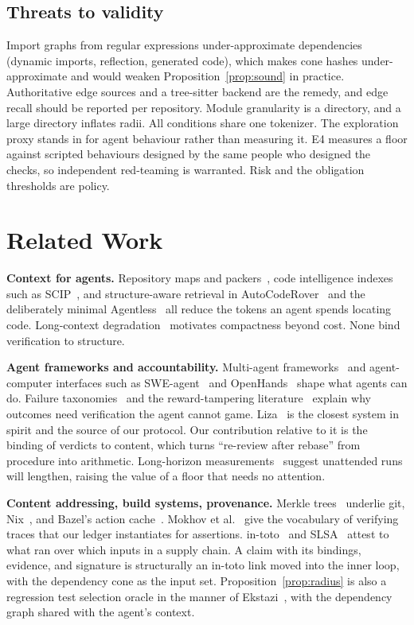 \documentclass[conference]{IEEEtran}
\begin{document}
\subsection{Threats to validity}

Import graphs from regular expressions under-approximate dependencies (dynamic imports, reflection, generated code), which makes cone hashes under-approximate and would weaken Proposition~\ref{prop:sound} in practice. Authoritative edge sources and a tree-sitter backend are the remedy, and edge recall should be reported per repository. Module granularity is a directory, and a large directory inflates radii. All conditions share one tokenizer. The exploration proxy stands in for agent behaviour rather than measuring it. E4 measures a floor against scripted behaviours designed by the same people who designed the checks, so independent red-teaming is warranted. Risk and the obligation thresholds are policy.

\section{Related Work}

\textbf{Context for agents.} Repository maps and packers~\citep{aider,repomix,stacklit}, code intelligence indexes such as SCIP~\citep{scip}, and structure-aware retrieval in AutoCodeRover~\citep{zhang2024autocoderover} and the deliberately minimal Agentless~\citep{xia2024agentless} all reduce the tokens an agent spends locating code. Long-context degradation~\citep{liu2024lost} motivates compactness beyond cost. None bind verification to structure.

\textbf{Agent frameworks and accountability.} Multi-agent frameworks~\citep{hong2024metagpt,qian2024chatdev,wu2023autogen,crewai} and agent-computer interfaces such as SWE-agent~\citep{yang2024sweagent} and OpenHands~\citep{wang2024openhands} shape what agents can do. Failure taxonomies~\citep{cemri2025mast} and the reward-tampering literature~\citep{sharma2024sycophancy,denison2024subterfuge} explain why outcomes need verification the agent cannot game. Liza~\citep{liza} is the closest system in spirit and the source of our protocol. Our contribution relative to it is the binding of verdicts to content, which turns ``re-review after rebase'' from procedure into arithmetic. Long-horizon measurements~\citep{kwa2025longtasks} suggest unattended runs will lengthen, raising the value of a floor that needs no attention.

\textbf{Content addressing, build systems, provenance.} Merkle trees~\citep{merkle1987} underlie git, Nix~\citep{dolstra2004nix}, and Bazel's action cache~\citep{bazel}. Mokhov et al.~\citep{mokhov2018build} give the vocabulary of verifying traces that our ledger instantiates for assertions. in-toto~\citep{intoto2019} and SLSA~\citep{slsa} attest to what ran over which inputs in a supply chain. A claim with its bindings, evidence, and signature is structurally an in-toto link moved into the inner loop, with the dependency cone as the input set. Proposition~\ref{prop:radius} is also a regression test selection oracle in the manner of Ekstazi~\citep{gligoric2015ekstazi}, with the dependency graph shared with the agent's context.
\end{document}
